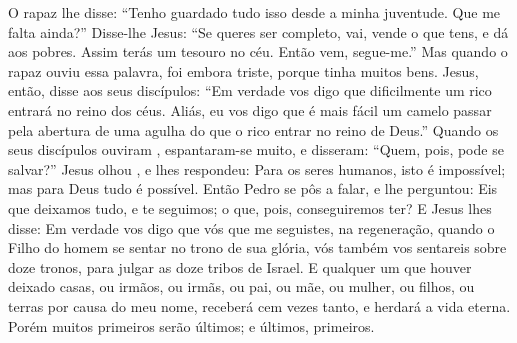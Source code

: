 {  O rapaz lhe disse: “Tenho guardado tudo isso desde a minha juventude. Que me falta ainda?”
  Disse-lhe Jesus: “Se queres ser completo, vai, vende o que tens, e dá aos pobres. Assim terás um tesouro no céu. Então vem, segue-me.”
  Mas quando o rapaz ouviu essa palavra, foi embora triste, porque tinha muitos bens.
  Jesus, então, disse aos seus discípulos: “Em verdade vos digo que dificilmente um rico entrará no reino dos céus.
  Aliás, eu vos digo que é mais fácil um camelo passar pela abertura de uma agulha do que o rico entrar no reino de Deus.”
  Quando os seus discípulos ouviram
{},  espantaram-se muito, e disseram: “Quem, pois, pode se salvar?”
  Jesus olhou
{}, e lhes respondeu: Para os seres humanos, isto é impossível; mas para Deus tudo é possível.
  Então Pedro se pôs a falar, e lhe perguntou: Eis que deixamos tudo, e te seguimos; o que, pois, conseguiremos ter?
  E Jesus lhes disse: Em verdade vos digo que vós que me seguistes, na regeneração, quando o Filho do homem se sentar no trono de sua glória, vós também vos sentareis sobre doze tronos, para julgar as doze tribos de Israel.
  E qualquer um que houver deixado casas, ou irmãos, ou irmãs, ou pai, ou mãe, ou mulher, ou filhos, ou terras por causa do meu nome, receberá cem vezes tanto,
 e herdará a vida eterna.
  Porém muitos primeiros serão últimos; e últimos, primeiros.
\par }

